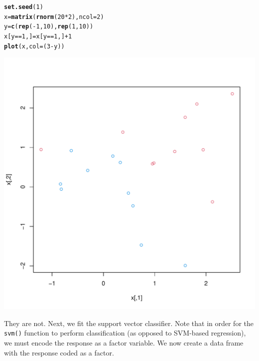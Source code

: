\documentclass[12pt]{article}\usepackage[]{graphicx}\usepackage[]{color}
\makeatletter
\def\maxwidth{ %
  \ifdim\Gin@nat@width>\linewidth
    \linewidth
  \else
    \Gin@nat@width
  \fi
}
\newcommand{\hlnum}[1]{\textcolor[rgb]{0.686,0.059,0.569}{#1}}%
\newcommand{\hlopt}[1]{\textcolor[rgb]{0,0,0}{#1}}%
\newcommand{\hlstd}[1]{\textcolor[rgb]{0.345,0.345,0.345}{#1}}%
\newcommand{\hlkwb}[1]{\textcolor[rgb]{0.69,0.353,0.396}{#1}}%
\newcommand{\hlkwc}[1]{\textcolor[rgb]{0.333,0.667,0.333}{#1}}%
\newcommand{\hlkwd}[1]{\textcolor[rgb]{0.737,0.353,0.396}{\textbf{#1}}}%
\newenvironment{kframe}{%
 \def\at@end@of@kframe{}%
 \ifinner\ifhmode%
  \def\at@end@of@kframe{\end{minipage}}%
  \begin{minipage}{\columnwidth}%
 \fi\fi%
 \def\FrameCommand##1{\hskip\@totalleftmargin \hskip-\fboxsep
 \colorbox{shadecolor}{##1}\hskip-\fboxsep
     \hskip-\linewidth \hskip-\@totalleftmargin \hskip\columnwidth}%
 \MakeFramed {\advance\hsize-\width
   \@totalleftmargin\z@ \linewidth\hsize
   \@setminipage}}%
 {\par\unskip\endMakeFramed%
 \at@end@of@kframe}
\newenvironment{knitrout}{}{} %
\makeatother
\begin{document}
\begin{knitrout}
\color{fgcolor}\begin{kframe}
\begin{alltt}
\hlkwd{set.seed}\hlstd{(}\hlnum{1}\hlstd{)}
\hlstd{x}\hlkwb{=}\hlkwd{matrix}\hlstd{(}\hlkwd{rnorm}\hlstd{(}\hlnum{20}\hlopt{*}\hlnum{2}\hlstd{),} \hlkwc{ncol}\hlstd{=}\hlnum{2}\hlstd{)}
\hlstd{y}\hlkwb{=}\hlkwd{c}\hlstd{(}\hlkwd{rep}\hlstd{(}\hlopt{-}\hlnum{1}\hlstd{,}\hlnum{10}\hlstd{),} \hlkwd{rep}\hlstd{(}\hlnum{1}\hlstd{,}\hlnum{10}\hlstd{))}
\hlstd{x[y}\hlopt{==}\hlnum{1}\hlstd{,]}\hlkwb{=}\hlstd{x[y}\hlopt{==}\hlnum{1}\hlstd{,]}\hlopt{+}\hlnum{1}
\hlkwd{plot}\hlstd{(x,} \hlkwc{col}\hlstd{=(}\hlnum{3}\hlopt{-}\hlstd{y))}
\end{alltt}
\end{kframe}
\includegraphics[width=\maxwidth]{figure/unnamed-chunk-2-1} 

\end{knitrout}

They are not. Next, we fit the support vector classifier. Note that in order for the \texttt{svm()} function to perform classification (as opposed to SVM-based regression), we must encode the response as a factor variable. We now create a data frame with the response coded as a factor.
\end{document}
